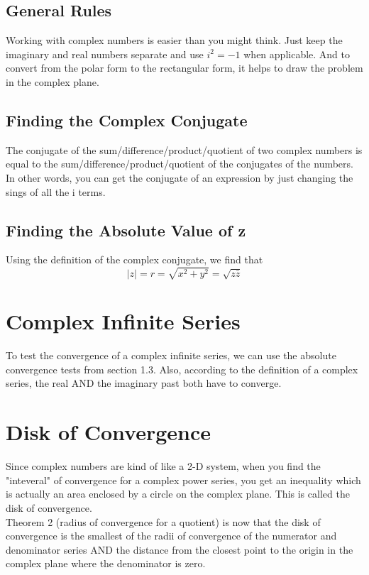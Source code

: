 \documentclass[oneside]{book}
\numberwithin{equation}{chapter} %
\begin{document}
\subsection{General Rules}
Working with complex numbers is easier than you might think. Just keep the imaginary and real numbers separate and use $i^2=-1$ when applicable. And to convert from the polar form to the rectangular form, it helps to draw the problem in the complex plane. 
\subsection{Finding the Complex Conjugate}
The conjugate of the sum/difference/product/quotient of two complex numbers is equal to the sum/difference/product/quotient of the conjugates of the numbers. In other words, you can get the conjugate of an expression by just changing the sings of all the i terms.
\subsection{Finding the Absolute Value of z}
Using the definition of the complex conjugate, we find that 
$$|z|=r=\sqrt{x^2+y^2}=\sqrt{z\bar{z}}$$
\section{Complex Infinite Series}
To test the convergence of a complex infinite series, we can use the absolute convergence tests from section 1.3. Also, according to the definition of a complex series, the real AND the imaginary past both have to converge. 
\section{Disk of Convergence}
Since complex numbers are kind of like a 2-D system, when you find the "inteveral" of convergence for a complex power series, you get an inequality which is actually an area enclosed by a circle on the complex plane. This is called the disk of convergence. \\

Theorem 2 (radius of convergence for a quotient) is now that the disk of convergence is the smallest of the radii of convergence of the numerator and denominator series AND the distance from the closest point to the origin in the complex plane where the denominator is zero. 
\end{document}
